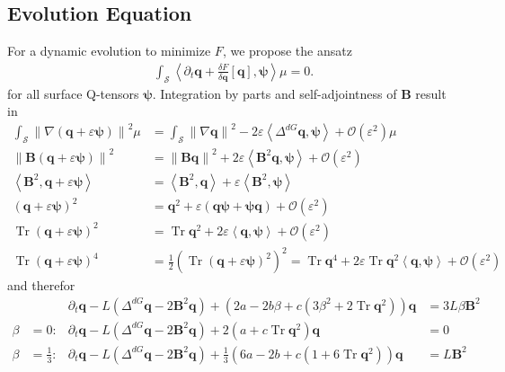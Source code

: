 \documentclass[a4paper,10pt]{scrartcl}
\newcommand{\surf}{\mathcal{S}}
\newcommand{\landau}{\mathcal{O}}
\newcommand{\Bb}{\mathbf{B}}
\newcommand{\qb}{\bm{q}}
\newcommand{\psib}{\bm{\psi}}
\newcommand{\trace}{\operatorname{Tr}}
\begin{document}
  \subsection{Evolution Equation}
    For a dynamic evolution to minimize \( F \), we propose the ansatz
    \begin{align}
      \int_{\surf}\left\langle \partial_{t}\qb + \frac{\delta F}{\delta \qb}\left[ \qb \right], \psib \right\rangle \mu = 0.
    \end{align}
    for all surface Q-tensors \( \psib \).
    Integration by parts and self-adjointness  of \( \Bb \) result in
    \begin{align}
      \int_{\surf} \left\| \nabla\left(\qb+\varepsilon\psib\right) \right\|^{2}\mu 
            &= \int_{\surf} \left\| \nabla\qb \right\|^{2} - 2\varepsilon\left\langle \Delta^{dG}\qb, \psib \right\rangle +\landau(\varepsilon^{2}) \mu \\
      \left\| \Bb\left(\qb+\varepsilon\psib\right) \right\|^{2} 
            &= \left\| \Bb\qb\right\|^{2} + 2\varepsilon\left\langle \Bb^{2}\qb,\psib \right\rangle +\landau(\varepsilon^{2}) \\
      \left\langle \Bb^{2},\qb+\varepsilon\psib \right\rangle 
            &= \left\langle \Bb^{2}, \qb \right\rangle + \varepsilon\left\langle \Bb^{2}, \psib \right\rangle\\
      \left( \qb+\varepsilon\psib \right)^{2}
            &= \qb^{2} + \varepsilon\left( \qb\psib + \psib\qb\right) + \landau(\varepsilon^{2}) \\
      \trace\left( \qb+\varepsilon\psib \right)^{2}
            &= \trace\qb^{2} + 2\varepsilon\left\langle \qb,\psib \right\rangle + \landau(\varepsilon^{2}) \\
      \trace\left( \qb+\varepsilon\psib \right)^{4}
            &= \frac{1}{2} \left( \trace\left( \qb+\varepsilon\psib \right)^{2}  \right)^{2}
             = \trace\qb^{4} + 2\varepsilon\trace\qb^{2}\left\langle \qb,\psib \right\rangle + \landau(\varepsilon^{2})
    \end{align}
    and therefor
    \begin{align}
      && \partial_{t}\qb - L\left( \Delta^{dG}\qb - 2\Bb^{2}\qb \right) + \left( 2a - 2b\beta + c\left( 3\beta^{2} + 2\trace\qb^{2}  \right) \right)\qb &= 3L\beta\Bb^{2}\\
      \beta &= 0: & \partial_{t}\qb - L\left( \Delta^{dG}\qb - 2\Bb^{2}\qb \right) + 2\left( a + c\trace\qb^{2}  \right)\qb &= 0 \\
      \beta &= \frac{1}{3}: & \partial_{t}\qb - L\left( \Delta^{dG}\qb - 2\Bb^{2}\qb \right) + \frac{1}{3}\left( 6a - 2b + c\left( 1+6\trace\qb^{2} \right) \right)\qb &= L\Bb^{2}
    \end{align}
\end{document}
